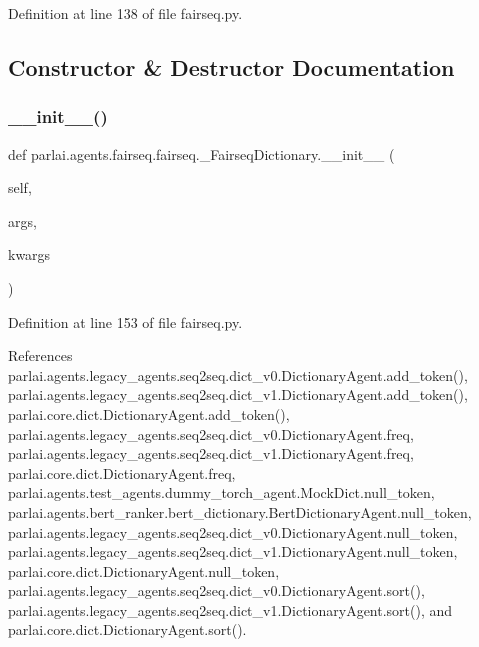 Definition at line 138 of file fairseq.\+py.



\subsection{Constructor \& Destructor Documentation}
\mbox{\label{classparlai_1_1agents_1_1fairseq_1_1fairseq_1_1__FairseqDictionary_ac92ccf75b3d43ba887fa828935f30fd4}} 
\subsubsection{\texorpdfstring{\+\_\+\+\_\+init\+\_\+\+\_\+()}{\_\_init\_\_()}}
{\footnotesize\ttfamily def parlai.\+agents.\+fairseq.\+fairseq.\+\_\+\+Fairseq\+Dictionary.\+\_\+\+\_\+init\+\_\+\+\_\+ (\begin{DoxyParamCaption}\item[{}]{self,  }\item[{}]{args,  }\item[{}]{kwargs }\end{DoxyParamCaption})}



Definition at line 153 of file fairseq.\+py.



References parlai.\+agents.\+legacy\+\_\+agents.\+seq2seq.\+dict\+\_\+v0.\+Dictionary\+Agent.\+add\+\_\+token(), parlai.\+agents.\+legacy\+\_\+agents.\+seq2seq.\+dict\+\_\+v1.\+Dictionary\+Agent.\+add\+\_\+token(), parlai.\+core.\+dict.\+Dictionary\+Agent.\+add\+\_\+token(), parlai.\+agents.\+legacy\+\_\+agents.\+seq2seq.\+dict\+\_\+v0.\+Dictionary\+Agent.\+freq, parlai.\+agents.\+legacy\+\_\+agents.\+seq2seq.\+dict\+\_\+v1.\+Dictionary\+Agent.\+freq, parlai.\+core.\+dict.\+Dictionary\+Agent.\+freq, parlai.\+agents.\+test\+\_\+agents.\+dummy\+\_\+torch\+\_\+agent.\+Mock\+Dict.\+null\+\_\+token, parlai.\+agents.\+bert\+\_\+ranker.\+bert\+\_\+dictionary.\+Bert\+Dictionary\+Agent.\+null\+\_\+token, parlai.\+agents.\+legacy\+\_\+agents.\+seq2seq.\+dict\+\_\+v0.\+Dictionary\+Agent.\+null\+\_\+token, parlai.\+agents.\+legacy\+\_\+agents.\+seq2seq.\+dict\+\_\+v1.\+Dictionary\+Agent.\+null\+\_\+token, parlai.\+core.\+dict.\+Dictionary\+Agent.\+null\+\_\+token, parlai.\+agents.\+legacy\+\_\+agents.\+seq2seq.\+dict\+\_\+v0.\+Dictionary\+Agent.\+sort(), parlai.\+agents.\+legacy\+\_\+agents.\+seq2seq.\+dict\+\_\+v1.\+Dictionary\+Agent.\+sort(), and parlai.\+core.\+dict.\+Dictionary\+Agent.\+sort().

